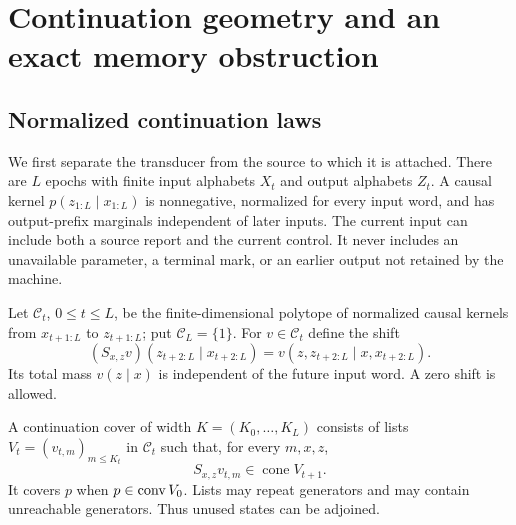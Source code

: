 \section{Continuation geometry and an exact memory obstruction}
\label{sec:v18-continuation}
\subsection{Normalized continuation laws}
We first separate the transducer from the source to which it is attached.
There are $L$ epochs with finite input alphabets $X_t$ and output alphabets
$Z_t$. A causal kernel $p(z_{1:L}\mid x_{1:L})$ is nonnegative, normalized
for every input word, and has output-prefix marginals independent of later
inputs. The current input can include both a source report and the current
control. It never includes an unavailable parameter, a terminal mark, or
an earlier output not retained by the machine.

Let $\mathcal C_t$, $0\le t\le L$, be the finite-dimensional polytope of
normalized causal kernels from $x_{t+1:L}$ to $z_{t+1:L}$; put
$\mathcal C_L=\{1\}$. For $v\in\mathcal C_t$ define the shift
\[
 (S_{x,z}v)(z_{t+2:L}\mid x_{t+2:L})
   =v(z,z_{t+2:L}\mid x,x_{t+2:L}).
\]
Its total mass $v(z\mid x)$ is independent of the future input word. A
zero shift is allowed.

\begin{definition}
\label{def:v18-cover}
A continuation cover of width $K=(K_0,\ldots,K_L)$ consists of lists
$V_t=(v_{t,m})_{m\le K_t}$ in $\mathcal C_t$ such that, for every $m,x,z$,
\begin{equation}\label{eq:v18-shift}
 S_{x,z}v_{t,m}\in\operatorname{cone} V_{t+1}.
\end{equation}
It covers $p$ when $p\in\operatorname{conv} V_0$. Lists may repeat generators and may
contain unreachable generators. Thus unused states can be adjoined.
\end{definition}

